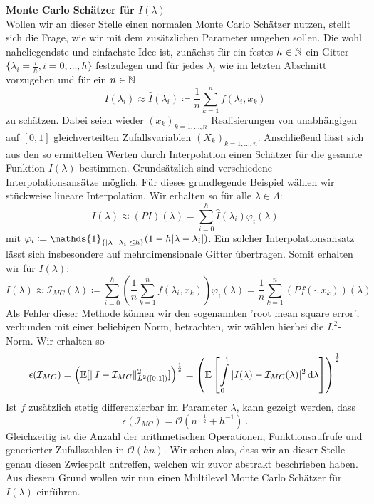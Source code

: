 \begin{Beispiel}
	\textbf{Monte Carlo Schätzer für $I(\lambda)$}\\
	Wollen wir an dieser Stelle einen normalen Monte Carlo Schätzer nutzen, stellt sich die Frage, wie wir mit dem zusätzlichen Parameter umgehen sollen. Die wohl naheliegendste und einfachste Idee ist, zunächst für ein festes $ h \in \mathbb{N} $ ein Gitter $ \{ \lambda_i = \frac{i}{h}, i=0,\dots,h\} $ festzulegen und für jedes $ \lambda_i $ wie im letzten Abschnitt vorzugehen und für ein $ n \in \mathbb{N} $
	\[
		I(\lambda_i) \approx \hat{I}(\lambda_i) \coloneqq \frac{1}{n} \sum_{k=1}^{n} f(\lambda_i,x_k)
	\]
	zu schätzen. Dabei seien wieder $ (x_k)_{k=1,\dots,n} $ Realisierungen von unabhängigen auf $ [0,1] $ gleichverteilten Zufallsvariablen $ (X_k)_{k=1,\dots,n} $.
	Anschließend lässt sich aus den so ermittelten Werten durch Interpolation einen Schätzer für die gesamte Funktion $ I(\lambda) $ bestimmen. Grundsätzlich sind verschiedene Interpolationsansätze möglich. Für dieses grundlegende Beispiel wählen wir stückweise lineare Interpolation. Wir erhalten so für alle $ \lambda \in \Lambda $:
	\[
		I(\lambda) \approx (PI)(\lambda) = \sum_{i=0}^{h} \hat{I}(\lambda_i) \varphi_i(\lambda)
	\]
	mit $ \varphi_i \coloneqq \mathds{1}_{ \{\abs{\lambda - \lambda_i} \leq h \} }(1-h\abs{\lambda-\lambda_i})$. Ein solcher Interpolationsansatz lässt sich insbesondere auf mehrdimensionale Gitter übertragen.
	Somit erhalten wir für $ I(\lambda) $:
	\[
		I(\lambda) \approx \mathcal{I}_{MC}(\lambda) \coloneqq \sum_{i=0}^{h} \left( \frac{1}{n}\sum_{k=1}^{n} f(\lambda_i, x_k)\right) \varphi_i (\lambda) = \frac{1}{n} \sum_{k=1}^{n} (Pf(\cdot,x_k))(\lambda)
	\]
	Als Fehler dieser Methode können wir den sogenannten 'root mean square error', verbunden mit einer beliebigen Norm, betrachten, wir wählen hierbei die $ L^2 $-Norm.
	Wir erhalten so 
	\[ 
	\epsilon(\mathcal{I}_{MC})  = \left( \mathbb{E} [\lVert I -  \mathcal{I}_{MC} \rVert_{L^2([0,1])}^2] \right)^{\frac{1}{2}} = \left( \mathbb{E} \left[ \int\limits_{0}^{1} | I(\lambda) - \mathcal{I}_{MC}(\lambda) |^2 \, \mathrm{d} \lambda \right] \right)^{\frac{1}{2}}
	\]
	Ist $ f $ zusätzlich stetig differenzierbar im Parameter $ \lambda $, kann gezeigt werden, dass 
	\[
		\epsilon(\mathcal{I}_{MC}) = \mathcal{O}(n^{-\frac{1}{2}}+h^{-1}) \ .
	\]
	Gleichzeitig ist die Anzahl der arithmetischen Operationen, Funktionsaufrufe und generierter Zufallszahlen in $ \mathcal{O}(hn) $.
	Wir sehen also, dass wir an dieser Stelle genau diesen Zwiespalt antreffen, welchen wir zuvor abstrakt beschrieben haben. Aus diesem Grund wollen wir nun einen Multilevel Monte Carlo Schätzer für $ I(\lambda) $ einführen.\\	
	

\end{Beispiel}
